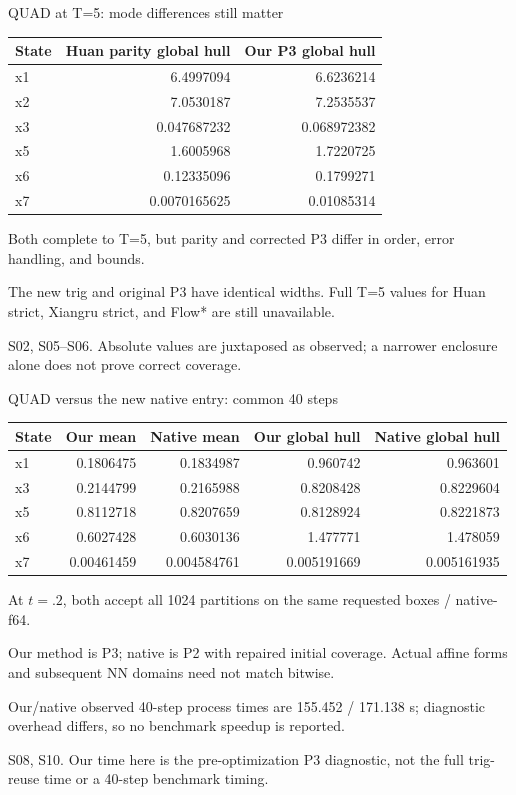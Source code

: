 \documentclass[aspectratio=169,11pt]{beamer}
\newcommand{\src}[1]{\par\vfill{\fontsize{7}{9}\selectfont\color{gray}#1\par}}
\begin{document}
\begin{frame}[t]{QUAD at T=5: mode differences still matter}
\relax
\relax
{\small\setlength{\tabcolsep}{3.2pt}\renewcommand{\arraystretch}{1.18}
\noindent\begin{tabular*}{\linewidth}{@{\extracolsep{\fill}}lrr@{}}\toprule
\textbf{State} & \textbf{Huan parity global hull} & \textbf{Our P3 global hull}\\ \midrule
x1 & 6.4997094 & 6.6236214\\
x2 & 7.0530187 & 7.2535537\\
x3 & 0.047687232 & 0.068972382\\
x5 & 1.6005968 & 1.7220725\\
x6 & 0.12335096 & 0.1799271\\
x7 & 0.0070165625 & 0.01085314\\
\bottomrule\end{tabular*}\par{}}\vspace{0.3cm}Both complete to T=5, but parity and corrected P3 differ in order, error handling, and bounds.\par{}The new trig and original P3 have identical widths. Full T=5 values for Huan strict, Xiangru strict, and Flow* are still unavailable.
\src{S02, S05–S06. Absolute values are juxtaposed as observed; a narrower enclosure alone does not prove correct coverage.}
\end{frame}

\begin{frame}[t]{QUAD versus the new native entry: common 40 steps}
\relax
\relax
{\footnotesize\setlength{\tabcolsep}{3.2pt}\renewcommand{\arraystretch}{1.18}
\noindent\begin{tabular*}{\linewidth}{@{\extracolsep{\fill}}lrrrr@{}}\toprule
\textbf{State} & \textbf{Our mean} & \textbf{Native mean} & \textbf{Our global hull} & \textbf{Native global hull}\\ \midrule
x1 & 0.1806475 & 0.1834987 & 0.960742 & 0.963601\\
x3 & 0.2144799 & 0.2165988 & 0.8208428 & 0.8229604\\
x5 & 0.8112718 & 0.8207659 & 0.8128924 & 0.8221873\\
x6 & 0.6027428 & 0.6030136 & 1.477771 & 1.478059\\
x7 & 0.00461459 & 0.004584761 & 0.005191669 & 0.005161935\\
\bottomrule\end{tabular*}\par{}}\vspace{0.35cm}At \(t=.2\), both accept all 1024 partitions on the same requested boxes / native-f64.\par{}Our method is P3; native is P2 with repaired initial coverage. Actual affine forms and subsequent NN domains need not match bitwise.\par{}Our/native observed 40-step process times are 155.452 / 171.138 s; diagnostic overhead differs, so no benchmark speedup is reported.
\src{S08, S10. Our time here is the pre-optimization P3 diagnostic, not the full trig-reuse time or a 40-step benchmark timing.}
\end{frame}
\end{document}
